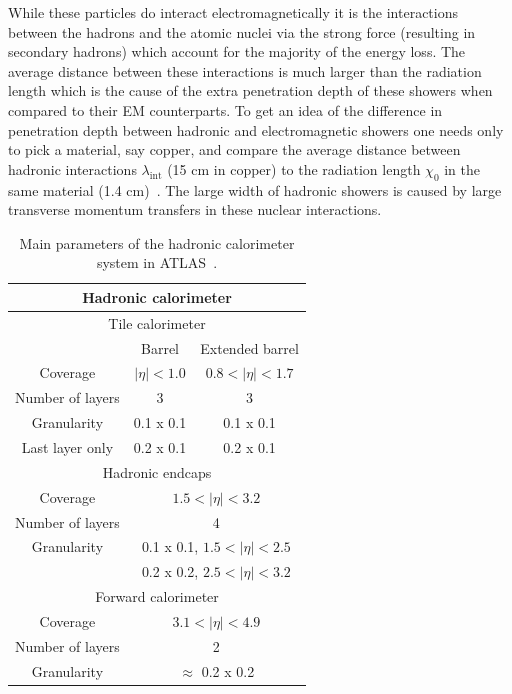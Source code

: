 While these particles do interact electromagnetically it is the interactions between the hadrons and the atomic nuclei via the strong force (resulting in secondary hadrons) which account for the majority of the energy loss.  
The average distance between these interactions is much larger than the radiation length which is the cause of the extra penetration depth of these showers when compared to their EM counterparts.  
To get an idea of the difference in penetration depth between hadronic and electromagnetic showers one needs only to pick a material, say copper, and compare the average distance between hadronic interactions $\lambda_{\mathrm{int}}$ (15 cm in copper) to the radiation length $\chi_{0}$ in the same material (1.4 cm)~\cite{Wigmans2008}.  
The large width of hadronic showers is caused by large transverse momentum transfers in these nuclear interactions.  

\begin{table}
  \centering
  \begin{tabular}{ |c|c|c|}
  \hline
  \multicolumn{3}{|c|}{\textbf{Hadronic calorimeter}} \\
  \hline
  \hline
  \multicolumn{3}{|c|}{Tile calorimeter} \\
  \hline 
                     & Barrel                                   & Extended barrel \\
  Coverage           & $\mid\eta\mid<1.0$                       & $0.8<\mid\eta\mid<1.7$ \\
  \hline 
  Number of layers   & 3                                        & 3 \\
  \hline 
  Granularity        & 0.1 x 0.1				& 0.1 x 0.1 \\
  Last layer only    & 0.2 x 0.1				& 0.2 x 0.1 \\
  \hline 
  \hline
  \multicolumn{3}{|c|}{Hadronic endcaps} \\
  \hline 
  Coverage           & 	\multicolumn{2}{|c|}{$1.5<\mid\eta\mid<3.2$} \\
  \hline
  Number of layers   &  \multicolumn{2}{|c|}{ 4} \\
  \hline
  Granularity        & 	\multicolumn{2}{|c|}{0.1 x 0.1, $1.5<\mid\eta\mid<2.5$} \\
  		     &  \multicolumn{2}{|c|}{ 0.2 x 0.2, $2.5<\mid\eta\mid<3.2$} \\
  \hline
  \hline
  \multicolumn{3}{|c|}{Forward calorimeter} \\
  \hline
  Coverage	     & \multicolumn{2}{|c|}{$3.1<\mid\eta\mid<4.9$} \\
  \hline
  Number of layers   & \multicolumn{2}{|c|}{2} \\
  \hline
  Granularity        & \multicolumn{2}{|c|}{$\approx$ 0.2 x 0.2} \\
  \hline
  \end{tabular}
  \caption[Main parameters of the hadronic calorimeter system. ]
        {\small Main parameters of the hadronic calorimeter system in ATLAS~\cite{JOIATLAS}. }
\label{table:HadCalo}
\end{table}

